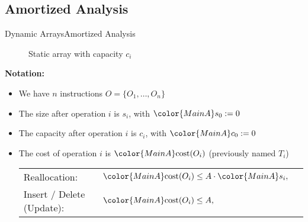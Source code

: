 \subsection{Amortized Analysis}

\begin{frame}{Dynamic Arrays}{Amortized Analysis}
  \vspace*{-1.0em}
  \begin{figure}[!t]%
    \def\FSAsize{16}\def\FSAelements{11}%
    \def\FSAcopy{0}\def\FSAdelete{0}\def\FSAinsert{0}%
    \def \FSAcopyarrow{1}%
    \def\FSAlabelsize{Size ${\color{MainA}s_i}$}%
    \def\FSAlabelcapacity{Capacity ${\color{MainA}c_i}$}%
    \vspace*{-0.5em}%
    \caption{Static array with capacity $c_i$}%
    \label{fig:array_amortized analysis}%
  \end{figure}%
  \vspace*{-1.0em}
  \textbf{Notation:}%
  \begin{itemize}%
    \item
      We have $n$ instructions $O = \{O_1,\dots,O_n\}$
    \item
      The {\color{MainA}size} after operation $i$ is
      {\color{MainA}$s_i$},
      with ${\color{MainA}s_0} := 0$
    \item
      The {\color{MainA}capacity} after operation $i$ is
      {\color{MainA}$c_i$},
      with ${\color{MainA}c_0} := 0$
    \item
      The {\color{MainA}cost} of operation $i$ is
      ${\color{MainA}\mathrm{cost}(O_i)}$
      (previously named $T_i$)\\[0.5em]
      \begin{tabular}{lll}
        Reallocation: &
        ${\color{MainA}\mathrm{cost}(O_i)}
          \leq A \cdot {\color{MainA}s_i},$ & {}\\
        Insert / Delete (Update): &
        ${\color{MainA}\mathrm{cost}(O_i)}
          \leq A,$ & {}
      \end{tabular}
  \end{itemize}
\end{frame}


